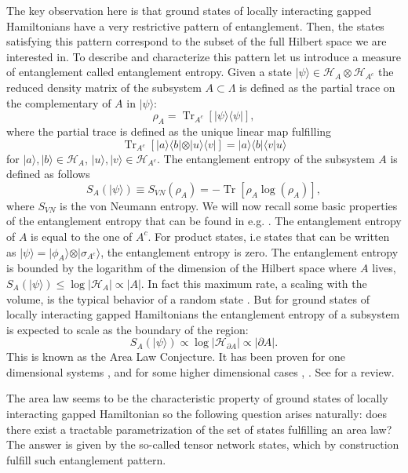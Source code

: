 \documentclass[smallextended]{svjour3}
\renewcommand{\1}{\mathbbm{1}}
\newcommand{\tr}{\operatorname{Tr}}
\newcommand{\ket} [1] {\vert #1 \rangle}
\newcommand{\bra} [1] {\langle #1 \vert}
\begin{document}
The key observation here is that  ground states of locally interacting gapped Hamiltonians have a very restrictive pattern of entanglement. Then, the states satisfying this pattern correspond to the subset of the full Hilbert space we are interested in. To describe and characterize this pattern let us introduce a measure of entanglement called entanglement entropy. Given a state $\ket{\psi}\in \mathcal{H}_A\otimes \mathcal{H}_{A^c}$ the reduced density matrix of the subsystem $A\subset \Lambda$ is defined as the partial trace on the complementary of $A$ in $\ket{\psi}$:
$$\rho_A=\tr_{A^c}\left[ \ket{\psi}\bra{\psi}\right],$$
where the partial trace is defined as the unique linear map fulfilling $$\tr_{A^c}\left[ \ket{a}\bra{b} \otimes \ket{u}\bra{v} \right]= \ket{a}\bra{b} \langle v\ket{u}$$ for $\ket{a},\ket{b}\in \mathcal{H}_A$, $\ket{u},\ket{v}\in \mathcal{H}_{A^c}$. The entanglement entropy of the subsystem $A$ is defined as follows
$$S_A( \ket{\psi})\equiv S_{VN}(\rho_A)= -\tr[\rho_A\log(\rho_A)],$$
where $S_{VN}$ is the von Neumann entropy. We will now recall some basic properties of the entanglement entropy that can be found in e.g. \cite{NielsenChuang}. The entanglement entropy of $A$ is equal to the one of $A^c$. For product states, i.e states that can be written as $ \ket{\psi}= \ket{\phi_A}\otimes  \ket{\sigma_{A^c}}$,  the entanglement entropy is zero. The entanglement entropy is bounded by the logarithm of the dimension of the Hilbert space where $A$ lives, $S_A( \ket{\psi})\le \log|\mathcal{H}_A|\propto |A|$. In fact this maximum rate, a scaling with the volume, is the typical behavior of a random state \cite{Hayden}. But for ground states of locally interacting gapped Hamiltonians the entanglement entropy of a subsystem is expected to scale as the boundary of the region:
$$S_A( \ket{\psi})\propto \log|\mathcal{H}_{\partial A}|\propto |\partial A|.$$
This is known as the Area Law Conjecture. It has been proven for one dimensional systems \cite{Hastings07}, \cite{Arad2013} and for some higher dimensional cases \cite{Hamza}, \cite{Masanes}. See \cite{Eisert} for a review.


The area law seems to be the characteristic property of ground states of locally interacting gapped Hamiltonian so the following question arises naturally: does there exist a tractable parametrization of the set of states fulfilling an area law? The answer is given by the so-called tensor network states, which by construction fulfill such entanglement pattern.
\end{document}
